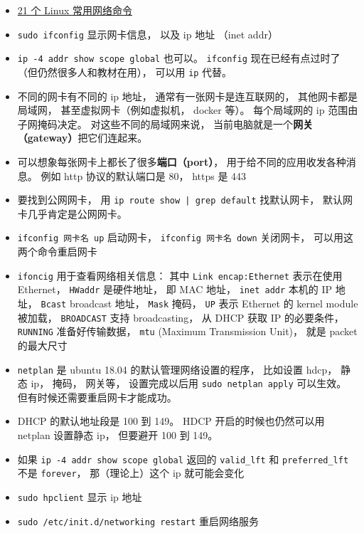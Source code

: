 
\begin{issues}
\issueDraft
\end{issues}

\begin{itemize}
\item \href{https://itsfoss.com/basic-linux-networking-commands/}{21 个 Linux 常用网络命令}
\item \verb`sudo ifconfig` 显示网卡信息， 以及 ip 地址 （inet addr）
\item \verb|ip -4 addr show scope global| 也可以。 \verb|ifconfig| 现在已经有点过时了（但仍然很多人和教材在用）， 可以用 \verb|ip| 代替。
\item 不同的网卡有不同的 ip 地址， 通常有一张网卡是连互联网的， 其他网卡都是局域网， 甚至虚拟网卡（例如虚拟机， docker 等）。 每个局域网的 ip 范围由子网掩码决定。 对这些不同的局域网来说， 当前电脑就是一个\textbf{网关（gateway）}把它们连起来。
\item 可以想象每张网卡上都长了很多\textbf{端口（port）}， 用于给不同的应用收发各种消息。 例如 http 协议的默认端口是 80， https 是 443
\item 要找到公网网卡， 用 \verb`ip route show | grep default` 找默认网卡， 默认网卡几乎肯定是公网网卡。
\item \verb`ifconfig 网卡名 up` 启动网卡， \verb`ifconfig 网卡名 down` 关闭网卡， 可以用这两个命令重启网卡
\item \verb`ifoncig` 用于查看网络相关信息： 其中 \verb`Link encap:Ethernet` 表示在使用 Ethernet， \verb`HWaddr` 是硬件地址， 即 MAC 地址， \verb`inet addr` 本机的 IP 地址， \verb`Bcast` broadcast 地址， \verb`Mask` 掩码， \verb`UP` 表示 Ethernet 的 kernel module 被加载， \verb`BROADCAST` 支持 broadcasting， 从 DHCP 获取 IP 的必要条件， \verb`RUNNING` 准备好传输数据， \verb`mtu` (Maximum Transmission Unit)， 就是 packet 的最大尺寸
\item \verb`netplan` 是 ubuntu 18.04 的默认管理网络设置的程序， 比如设置 hdcp， 静态 ip， 掩码， 网关等， 设置完成以后用 \verb`sudo netplan apply` 可以生效。 但有时候还需要重启网卡才能成功。
\item DHCP 的默认地址段是 100 到 149。 HDCP 开启的时候也仍然可以用 netplan 设置静态 ip， 但要避开 100 到 149。
\item 如果 \verb|ip -4 addr show scope global| 返回的 \verb|valid_lft| 和 \verb|preferred_lft| 不是 \verb|forever|， 那（理论上）这个 ip 就可能会变化
\item \verb`sudo hpclient` 显示 ip 地址
\item \verb`sudo /etc/init.d/networking restart` 重启网络服务 

\end{itemize}
